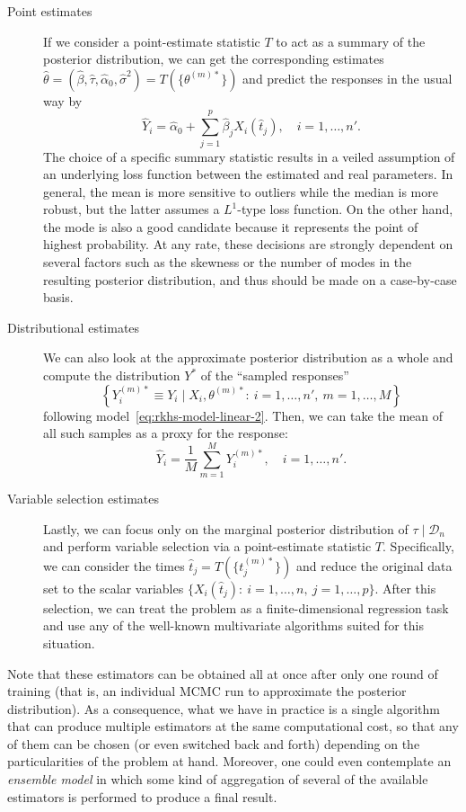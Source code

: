 \documentclass[ba]{imsart}
\numberwithin{equation}{section}
\theoremstyle{plain}
\begin{document}
\begin{description}
  \item[Point estimates] If we consider a point-estimate statistic \(T\) to act as a summary of the posterior distribution, we can get the corresponding estimates \(\hat{\theta}=(\hat \beta, \hat \tau, \hat{\alpha}_0, \hat{\sigma}^2) = T(\{\theta^{(m)*}\})\) and predict the responses in the usual way by
  \[
    \hat Y_i = \hat{\alpha}_0 + \sum_{j=1}^p \hat{\beta}_j X_i(\hat{t}_j), \quad i=1,\dots, n'.
  \]
  The choice of a specific summary statistic results in a veiled assumption of an underlying loss function between the estimated and real parameters. In general, the mean is more sensitive to outliers while the median is more robust, but the latter assumes a \(L^1\)-type loss function. On the other hand, the mode is also a good candidate because it represents the point of highest probability. At any rate, these decisions are strongly dependent on several factors such as the skewness or the number of modes in the resulting posterior distribution, and thus should be made on a case-by-case basis.
  \item[Distributional estimates] We can also look at the approximate posterior distribution as a whole and compute the distribution \(Y^*\) of the ``sampled responses''
  \[
  \left\{Y_i^{(m)*} \equiv Y_i \mid X_i, \theta^{(m)*}:\ i=1,\dots,n', \ m=1,\dots,M\right\}
  \]
  following model~\eqref{eq:rkhs-model-linear-2}. Then, we can take the mean of all such samples as a proxy for the response:
  \[
  \hat Y_i = \frac{1}{M}\sum_{m=1}^M Y_i^{(m)*}, \quad i=1,\dots,n'.
  \]
  \item[Variable selection estimates] Lastly, we can focus only on the marginal posterior distribution of \(\tau\mid\mathcal D_n\) and perform variable selection via a point-estimate statistic \(T\). Specifically, we can consider the times \(\hat t_j = T(\{t_j^{(m)*}\})\) and reduce the original data set to the scalar variables \(\{X_i(\hat t_j):\ i=1, \dots,n, \ j=1,\dots,p\}\). After this selection, we can treat the problem as a finite-dimensional regression task and use any of the well-known multivariate algorithms suited for this situation.
\end{description}

Note that these estimators can be obtained all at once after only one round of training (that is, an individual MCMC run to approximate the posterior distribution). As a consequence, what we have in practice is a single algorithm that can produce multiple estimators at the same computational cost, so that any of them can be chosen (or even switched back and forth) depending on the particularities of the problem at hand. Moreover, one could even contemplate an \textit{ensemble model} in which some kind of aggregation of several of the available estimators is performed to produce a final result.
\end{document}
